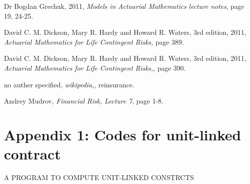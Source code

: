 \documentclass{report}
\begin{document}
\begin{thebibliography}{99}
  Dr Bogdan Grechuk,
    2011,
    {\em Models in Actuarial Mathematics lecture notes},
    page 19, 24-25.


  David C. M. Dickson, Mary R. Hardy and Howard R. Waters,
    3rd edition, 2011, 
    {\em Actuarial Mathematics for Life Contingent Risks,}
    page 389.


  David C. M. Dickson, Mary R. Hardy and Howard R. Waters,
    3rd edition, 2011, 
    {\em Actuarial Mathematics for Life Contingent Risks,},
    page 390.

  no auther specified,
    {\em wikipedia,},
    reinsurance.

  Andrey Mudrov,
    {\em Financial Risk, Lecture 7},
    page 1-8.





\end{thebibliography}




\chapter*{Appendix 1: Codes for unit-linked contract}

\begin{center}
   {\Large A PROGRAM TO COMPUTE UNIT-LINKED CONSTRCTS}
\end{center}
\end{document}
